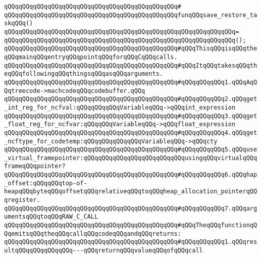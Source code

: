 \verb|qQQqqQQqqQQqqQQqqQQqqQQqqQQqqQQqqQQqqQQqqQQqqQQq#|\newline
\verb|qQQqqQQqqQQqqQQqqQQqqQQqqQQqqQQqqQQqqQQqqQQqqQQqfunqQQqsave_restore_taskqQQq()|\newline
\verb|qQQqqQQqqQQqqQQqqQQqqQQqqQQqqQQqqQQqqQQqqQQqqQQqqQQqqQQqqQQqqQQq=|\newline
\verb|qQQqqQQqqQQqqQQqqQQqqQQqqQQqqQQqqQQqqQQqqQQqqQQqqQQqqQQqqQQqqQQq();|\newline
\newline
\newline
\verb|qQQqqQQqqQQqqQQqqQQqqQQqqQQqqQQqqQQqqQQqqQQqqQQq#qQQqThisqQQqisqQQqtheqQQqmainqQQqentryqQQqpointqQQqforqQQqCqQQqcalls.|\newline
\verb|qQQqqQQqqQQqqQQqqQQqqQQqqQQqqQQqqQQqqQQqqQQqqQQq#qQQqItqQQqtakesqQQqtheqQQqfollowingqQQqthingsqQQqasqQQqarguments.|\newline
\verb|qQQqqQQqqQQqqQQqqQQqqQQqqQQqqQQqqQQqqQQqqQQqqQQq#qQQqqQQqqQQq1.qQQqAqQQqtreecode->machcodeqQQqcodebuffer.qQQq|\newline
\verb|qQQqqQQqqQQqqQQqqQQqqQQqqQQqqQQqqQQqqQQqqQQqqQQq#qQQqqQQqqQQq2.qQQqget_int_reg_for_ncfval:qQQqqQQqqQQqVariableqQQq->qQQqint_expression|\newline
\verb|qQQqqQQqqQQqqQQqqQQqqQQqqQQqqQQqqQQqqQQqqQQqqQQq#qQQqqQQqqQQq3.qQQqget_float_reg_for_ncfvar:qQQqqQQqVariableqQQq->qQQqfloat_expression|\newline
\verb|qQQqqQQqqQQqqQQqqQQqqQQqqQQqqQQqqQQqqQQqqQQqqQQq#qQQqqQQqqQQq4.qQQqget_ncftype_for_codetemp:qQQqqQQqqQQqqQQqVariableqQQq->qQQqcty|\newline
\verb|qQQqqQQqqQQqqQQqqQQqqQQqqQQqqQQqqQQqqQQqqQQqqQQq#qQQqqQQqqQQq5.qQQquse_virtual_framepointer:qQQqqQQqqQQqqQQqqQQqqQQqqQQqusingqQQqvirtualqQQqframeqQQqpointer?|\newline
\verb|qQQqqQQqqQQqqQQqqQQqqQQqqQQqqQQqqQQqqQQqqQQqqQQq#qQQqqQQqqQQq6.qQQqhap_offset:qQQqqQQqtop-of-heapqQQqbyteqQQqoffsetqQQqrelativeqQQqtoqQQqheap_allocation_pointerqQQqregister.|\newline
\verb|qQQqqQQqqQQqqQQqqQQqqQQqqQQqqQQqqQQqqQQqqQQqqQQq#qQQqqQQqqQQq7.qQQqargumentsqQQqtoqQQqRAW_C_CALL|\newline
\verb|qQQqqQQqqQQqqQQqqQQqqQQqqQQqqQQqqQQqqQQqqQQqqQQq#qQQqTheqQQqfunctionqQQqemitsqQQqtheqQQqcallqQQqcodeqQQqandqQQqreturns:|\newline
\verb|qQQqqQQqqQQqqQQqqQQqqQQqqQQqqQQqqQQqqQQqqQQqqQQq#qQQqqQQqqQQq1.qQQqresultqQQqqQQqqQQqqQQq---qQQqreturnqQQqvalueqQQqofqQQqcall|\newline
